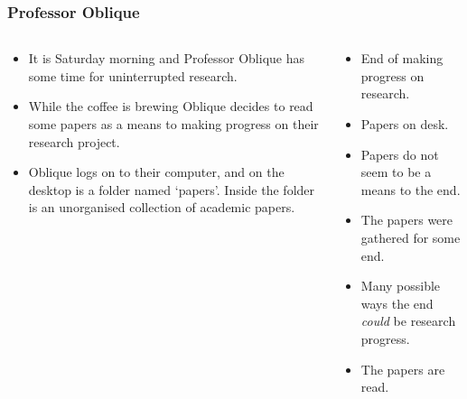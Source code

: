 \documentclass[noamssymb, compress, handout]{beamer} %
\begin{document}
\begin{frame}
  \frametitle{Professor Oblique}

  \begin{columns}[c]
    \begin{column}{0.6\textwidth}
      {\addtolength{\leftmargini}{-2\labelsep}
      \begin{itemize}
      \item<1-> It is Saturday morning and Professor Oblique has some time for uninterrupted research.
      \item<2-> While the coffee is brewing Oblique decides to read some papers as a means to making progress on their research project.
      \item<3-> Oblique logs on to their computer, and on the desktop is a folder named `papers'. Inside the folder is an unorganised collection of academic papers.
      \end{itemize}
      }
    \end{column}
    \vrule{}
    \begin{column}{0.3\textwidth}
      {
        \footnotesize
        \begin{itemize}
        \item<2-> End of making progress on research.
        \item<3-> Papers on desk.
        \item[] {\color{white} Papers do not seem to be a means to the end.}
        \item[] {\color{white} The papers were gathered for some end.}
        \item[] {\color{white} Many possible ways the end \emph{could} be research progress.}
        \item[] {\color{white} The papers are read.}
        \end{itemize}
      }
    \end{column}
  \end{columns}

\end{frame}
\end{document}
